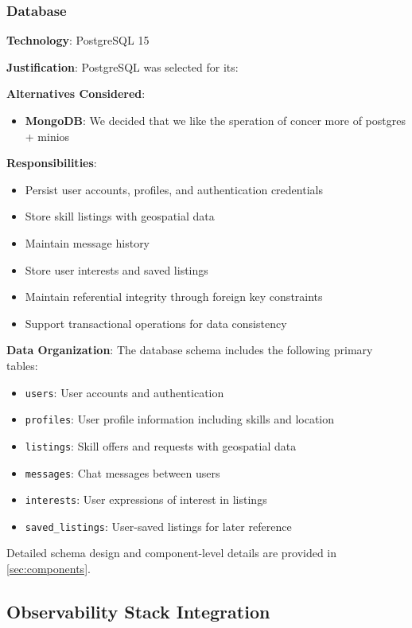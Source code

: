 \subsubsection{Database}
\textbf{Technology}: PostgreSQL 15

\textbf{Justification}:
PostgreSQL was selected for its:

\textbf{Alternatives Considered}:
\begin{itemize}
    \item \textbf{MongoDB}: We decided that we like the speration of concer more of postgres + minios
\end{itemize}

\textbf{Responsibilities}:
\begin{itemize}
    \item Persist user accounts, profiles, and authentication credentials
    \item Store skill listings with geospatial data
    \item Maintain message history
    \item Store user interests and saved listings
    \item Maintain referential integrity through foreign key constraints
    \item Support transactional operations for data consistency
\end{itemize}

\textbf{Data Organization}:
The database schema includes the following primary tables:
\begin{itemize}
    \item \texttt{users}: User accounts and authentication
    \item \texttt{profiles}: User profile information including skills and location
    \item \texttt{listings}: Skill offers and requests with geospatial data
    \item \texttt{messages}: Chat messages between users
    \item \texttt{interests}: User expressions of interest in listings
    \item \texttt{saved\_listings}: User-saved listings for later reference
\end{itemize}

Detailed schema design and component-level details are provided in \cref{sec:components}.

\subsection{Observability Stack Integration}

